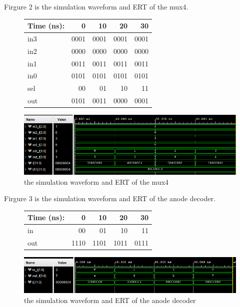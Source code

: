 \documentclass[11pt]{article}
\begin{document}
    Firgure 2 is the simulation waveform and ERT of the mux4.\\
    \begin{figure}[ht]\centering
        \begin{tabular}{l|rrrr}
            Time (ns): & 0 & 10 & 20 & 30 \\
            \midrule
            in3 & 0001 & 0001 & 0001 & 0001 \\
            in2 & 0000 & 0000 & 0000 & 0000 \\
            in1 & 0011 & 0011 & 0011 & 0011 \\
            in0 & 0101 & 0101 & 0101 & 0101 \\
            sel & 00 & 01 & 10 & 11 \\
            \midrule
            out & 0101 & 0011 & 0000 & 0001 \\
            \bottomrule
        \end{tabular}\medskip

        \includegraphics[width=1\textwidth]{mux4_simulation}
        \caption{the simulation waveform and ERT of the mux4}
        \label{fig:mux4_simulation}
    \end{figure}


    Firgure 3 is the simulation waveform and ERT of the anode decoder.\\
    \begin{figure}[ht]\centering
        \begin{tabular}{l|rrrr}
            Time (ns): & 0 & 10 & 20 & 30 \\
            \midrule
            in & 00 & 01 & 10 & 11 \\
            \midrule
            out & 1110 & 1101 & 1011 & 0111 \\
            \bottomrule
        \end{tabular}\medskip

        \includegraphics[width=1\textwidth]{anode_decoder_simulation}
        \caption{the simulation waveform and ERT of the anode decoder}
        \label{fig:anode_decoder_simulation}
    \end{figure}
\end{document}
